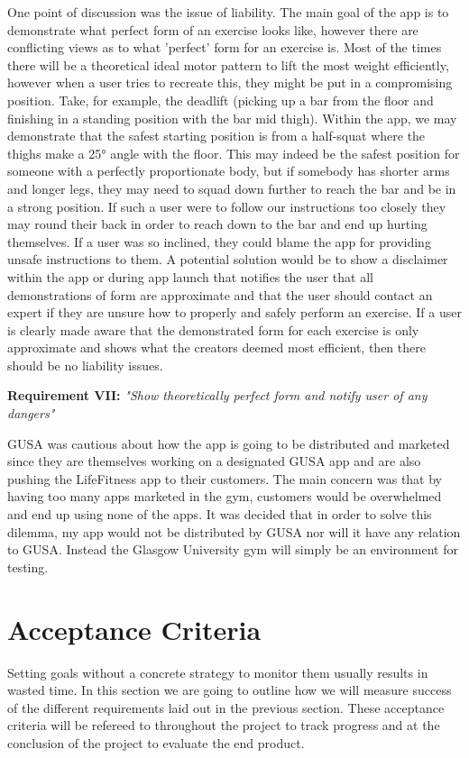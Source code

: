 \documentclass{l4proj}
\begin{document}
One point of discussion was the issue of liability. The main goal of the app is to demonstrate what perfect form of an exercise looks like, however there are conflicting views as to what 'perfect' form for an exercise is. Most of the times there will be a theoretical ideal motor pattern to lift the most weight efficiently, however when a user tries to recreate this, they might be put in a compromising position. Take, for example, the deadlift (picking up a bar from the floor and finishing in a standing position with the bar mid thigh). Within the app, we may demonstrate that the safest starting position is from a half-squat where the thighs make a 25° angle with the floor. This may indeed be the safest position for someone with a perfectly proportionate body, but if somebody has shorter arms and longer legs, they may need to squad down further to reach the bar and be in a strong position. If such a user were to follow our instructions too closely they may round their back in order to reach down to the bar and end up hurting themselves. If a user was so inclined, they could blame the app for providing unsafe instructions to them. A potential solution would be to show a disclaimer within the app or during app launch that notifies the user that all demonstrations of form are approximate and that the user should contact an expert if they are unsure how to properly and safely perform an exercise. If a user is clearly made aware that the demonstrated form for each exercise is only approximate and shows what the creators deemed most efficient, then there should be no liability issues. 

\textbf{Requirement VII:} \textit{"Show theoretically perfect form and notify user of any dangers"} \label{requirement_VII}

GUSA was cautious about how the app is going to be distributed and marketed since they are themselves working on a designated GUSA app and are also pushing the LifeFitness app to their customers. The main concern was that by having too many apps marketed in the gym, customers would be overwhelmed and end up using none of the apps. It was decided that in order to solve this dilemma, my app would not be distributed by GUSA nor will it have any relation to GUSA. Instead the Glasgow University gym will simply be an environment for testing. 

\section{Acceptance Criteria}
Setting goals without a concrete strategy to monitor them usually results in wasted time. In this section we are going to outline how we will measure success of the different requirements laid out in the previous section. These acceptance criteria will be refereed to throughout the project to track progress and at the conclusion of the project to evaluate the end product. 
\end{document}
